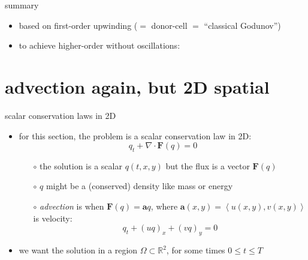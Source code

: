 \documentclass[10pt,dvipsnames,usepdftitle=false,
hyperref={pdftitle = {Finite volume methods},
    pdfauthor = {Ed Bueler}}]{beamer}
\newcommand{\ba}{\mathbf{a}}
\newcommand{\bF}{\mathbf{F}}
\newcommand{\Div}{\nabla\cdot}
\newcommand{\RR}{\mathbb{R}}
\begin{document}
\begin{frame}{summary}
\begin{itemize}
\begin{itemize}
\begin{itemize}
        \item based on first-order upwinding ($=$ donor-cell $=$ ``classical Godunov'')
        \item to achieve higher-order without oscillations:
        \end{itemize}
    \end{itemize}
\end{itemize}
\end{frame}


\section{advection again, but 2D spatial}

\begin{frame}{scalar conservation laws in 2D}

\begin{itemize}
\item for this section, the problem is a scalar conservation law in 2D:
    $$q_t + \Div \bF(q) = 0$$

    \begin{itemize}
    \item[$\circ$] the solution is a scalar $q(t,x,y)$ but the flux is a vector $\bF(q)$
    \item[$\circ$] $q$ might be a (conserved) density like mass or energy
    \item[$\circ$] \emph{advection} is when $\bF(q) = \ba q$, where $\ba(x,y) = \left<u(x,y), v(x,y)\right>$ is velocity:
    $$q_t + (u q)_x + (v q)_y = 0$$
    \end{itemize}
\item we want the solution in a region $\Omega\subset \RR^2$, for some times $0\le t \le T$
\end{itemize}
\end{frame}
\end{document}

